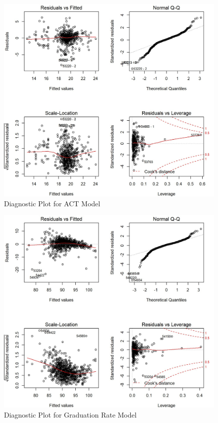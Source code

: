 \documentclass[letterpaper, 10 pt, conference]{ieeeconf}  %
\begin{document}
\begin{figure}[h]
\begin{center}
\includegraphics[width=\columnwidth]{DiagnosticPlot_ACT.jpg}
\end{center}
\caption{Diagnostic Plot for ACT Model}
\label{fig:short}
\end{figure}

\begin{figure}[h]
\begin{center}
\includegraphics[width=\columnwidth]{DiagnosticPlot_Grad.jpg}
\end{center}
\caption{Diagnostic Plot for Graduation Rate Model}
\label{fig:short}
\end{figure}
\end{document}
